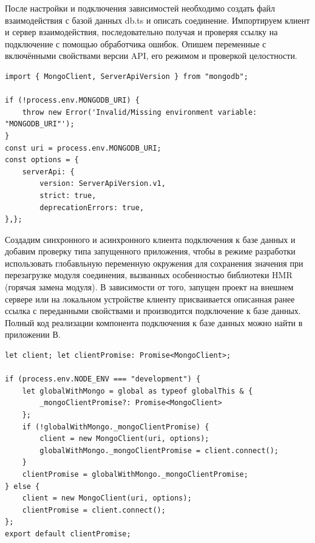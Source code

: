 \documentclass[master, och, diploma]{SCWorks}
\begin{document}
После настройки и подключения зависимостей необходимо создать файл взаимодействия с базой данных db.ts и описать соединение. Импортируем клиент и сервер взаимодействия, последовательно получая и проверяя ссылку на подключение с помощью обработчика ошибок. Опишем переменные с включёнными свойствами версии API, его режимом и проверкой целостности.
\begin{verbatim}
import { MongoClient, ServerApiVersion } from "mongodb";

if (!process.env.MONGODB_URI) {
    throw new Error('Invalid/Missing environment variable: "MONGODB_URI"');
}
const uri = process.env.MONGODB_URI;
const options = {
    serverApi: {
        version: ServerApiVersion.v1,
        strict: true,
        deprecationErrors: true,
},};
\end{verbatim}

Создадим синхронного и асинхронного клиента подключения к базе данных и добавим проверку типа запущенного приложения, чтобы в режиме разработки использовать глобавльную переменную окружения для сохранения значения при перезагрузке модуля соединения, вызванных особенностью библиотеки HMR (горячая замена модуля). В зависимости от того, запущен проект на внешнем сервере или на локальном устройстве клиенту присваивается описанная ранее ссылка с переданными свойствами и производится подключение к базе данных. Полный код реализации компонента подключения к базе данных можно найти в приложении В.
\begin{verbatim}
let client; let clientPromise: Promise<MongoClient>;
 
if (process.env.NODE_ENV === "development") {
    let globalWithMongo = global as typeof globalThis & {
        _mongoClientPromise?: Promise<MongoClient>
    };
    if (!globalWithMongo._mongoClientPromise) {
        client = new MongoClient(uri, options);
        globalWithMongo._mongoClientPromise = client.connect();
    }
    clientPromise = globalWithMongo._mongoClientPromise;
} else {
    client = new MongoClient(uri, options);
    clientPromise = client.connect();
};
export default clientPromise;
\end{verbatim}
\end{document}
